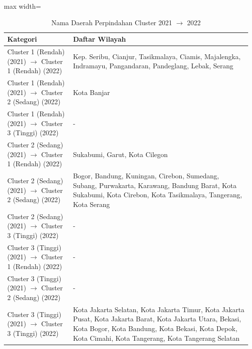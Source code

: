 \begin{table}[H]
\centering
\caption{Nama Daerah Perpindahan Cluster 2021 \(\rightarrow\) 2022} \label{tab:app2transname2021x2022}
\begin{adjustbox}{max width=\textwidth}
\begin{tabular}{|p{4cm}|p{10cm}|}
\hline
\textbf{Kategori} & \textbf{Daftar Wilayah} \\
\hline
Cluster 1 (Rendah) (2021) \(\rightarrow\) Cluster 1 (Rendah) (2022) & Kep. Seribu, Cianjur, Tasikmalaya, Ciamis, Majalengka, Indramayu, Pangandaran, Pandeglang, Lebak, Serang \\
\hline
Cluster 1 (Rendah) (2021) \(\rightarrow\) Cluster 2 (Sedang) (2022) & Kota Banjar \\
\hline
Cluster 1 (Rendah) (2021) \(\rightarrow\) Cluster 3 (Tinggi) (2022) & - \\
\hline
Cluster 2 (Sedang) (2021) \(\rightarrow\) Cluster 1 (Rendah) (2022) & Sukabumi, Garut, Kota Cilegon \\
\hline
Cluster 2 (Sedang) (2021) \(\rightarrow\) Cluster 2 (Sedang) (2022) & Bogor, Bandung, Kuningan, Cirebon, Sumedang, Subang, Purwakarta, Karawang, Bandung Barat, Kota Sukabumi, Kota Cirebon, Kota Tasikmalaya, Tangerang, Kota Serang \\
\hline
Cluster 2 (Sedang) (2021) \(\rightarrow\) Cluster 3 (Tinggi) (2022) & - \\
\hline
Cluster 3 (Tinggi) (2021) \(\rightarrow\) Cluster 1 (Rendah) (2022) & - \\
\hline
Cluster 3 (Tinggi) (2021) \(\rightarrow\) Cluster 2 (Sedang) (2022) & - \\
\hline
Cluster 3 (Tinggi) (2021) \(\rightarrow\) Cluster 3 (Tinggi) (2022) & Kota Jakarta Selatan, Kota Jakarta Timur, Kota Jakarta Pusat, Kota Jakarta Barat, Kota Jakarta Utara, Bekasi, Kota Bogor, Kota Bandung, Kota Bekasi, Kota Depok, Kota Cimahi, Kota Tangerang, Kota Tangerang Selatan \\
\hline
\end{tabular}
\end{adjustbox}
\end{table}